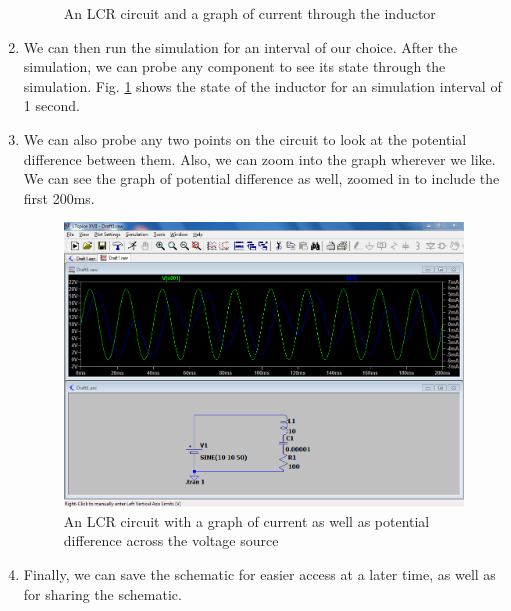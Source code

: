 \documentclass{article}
\begin{document}
\begin{enumerate}
\begin{figure}[h]
		\caption{An LCR circuit and a graph of current through the inductor}
		\label{fig:ltspice_2}
	\end{figure}
	\item We can then run the simulation for an interval of our choice. After the simulation, we can probe any component to see its state through the simulation. Fig. \ref{fig:ltspice_2} shows the state of the inductor for an simulation interval of 1 second.
	\item We can also probe any two points on the circuit to look at the potential difference between them. Also, we can zoom into the graph wherever we like. We can see the graph of potential difference as well, zoomed in to include the first 200ms.
	\begin{figure}[h]
		\centering
		\includegraphics[width=0.7\linewidth]{Capture3}
		\caption{An LCR circuit with a graph of current as well as potential difference across the voltage source}
		\label{fig:ltspice_3}
	\end{figure}
	\item Finally, we can save the schematic for easier access at a later time, as well as for sharing the schematic.
\end{enumerate}
\end{document}

